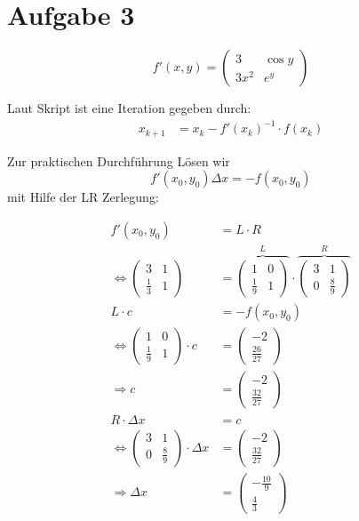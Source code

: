 \section*{Aufgabe 3}
\[f' (x,y) = \begin{pmatrix}
	3     & \cos y\\
	3 x^2 & e^y
\end{pmatrix}\]

Laut Skript ist eine Iteration gegeben durch:
\begin{align}
x_{k+1}&=x_{k}-f'(x_k)^{-1}\cdot f(x_k)
\end{align}

Zur praktischen Durchführung Lösen wir
\[f'(x_0, y_0)\Delta x = -f(x_0,y_0)\]
mit Hilfe der LR Zerlegung:

\begin{align}
%
	f'(x_0,y_0)	&= L \cdot R \\
	\Leftrightarrow \begin{pmatrix}
		3     & 1\\
		\frac{1}{3} & 1
	\end{pmatrix}
	&=
	\overbrace{\begin{pmatrix}
		1      & 0\\
		\frac{1}{9} & 1
	\end{pmatrix}}^L \cdot 
	\overbrace{\begin{pmatrix}
		3 & 1\\
		0      & \frac{8}{9}
	\end{pmatrix}}^R\\
%
	L \cdot c	&= -f(x_0,y_0) \\
	\Leftrightarrow
	\begin{pmatrix}
		1      & 0\\
		\frac{1}{9} & 1
	\end{pmatrix}
	\cdot c
	&=
		\begin{pmatrix}
		-2\\
		\frac{26}{27}
	\end{pmatrix}\\
	\Rightarrow
	c &= 		\begin{pmatrix}
		-2\\
		\frac{32}{27}
	\end{pmatrix}\\
%
	R\cdot \Delta x &= c\\
	\Leftrightarrow
	\begin{pmatrix}
		3 & 1\\
		0      & \frac{8}{9}
	\end{pmatrix}
	\cdot \Delta x &=
	\begin{pmatrix}
		-2\\
		\frac{32}{27}
	\end{pmatrix}\\
	\Rightarrow \Delta x &= 
	\begin{pmatrix}
		-\frac{10}{9}\\
		\frac{4}{3}
	\end{pmatrix}
\end{align}

